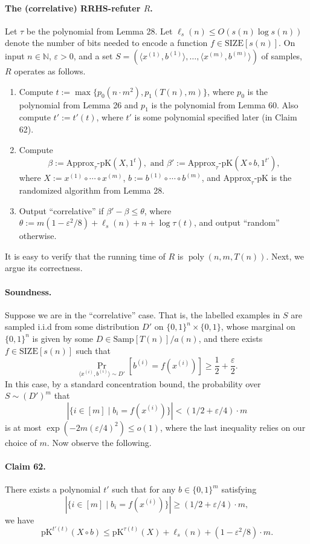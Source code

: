 \paragraph{The (correlative) RRHS-refuter $R$.} Let $\tau$ be the polynomial from Lemma 28. Let $\ell_s(n)\leq O(s(n)\log s(n))$ denote the number of bits needed to encode a function $f\in\mathrm{SIZE}[s(n)]$. On input $n\in\mathbb N$, $\varepsilon>0$, and a set $S=(\langle x^{(1)},b^{(1)}\rangle,\ldots,\langle x^{(m)},b^{(m)}\rangle)$ of samples, $R$ operates as follows.
\begin{enumerate}
\item Compute $t:=\max\{p_0(n\cdot m^2),p_1(T(n),m)\}$, where $p_0$ is the polynomial from Lemma 26 and $p_1$ is the polynomial from Lemma 60. Also compute $t':=t'(t)$, where $t'$ is some polynomial specified later (in Claim 62).
\item Compute
\[\beta:=\mathrm{Approx}_\tau\text{-}\mathrm{pK}(X,1^t),\text{ and }\beta':=\mathrm{Approx}_\tau\text{-}\mathrm{pK}(X\circ b,1^{t'}),\]
where $X:=x^{(1)}\circ\cdots\circ x^{(m)}$, $b:=b^{(1)}\circ\cdots\circ b^{(m)}$, and $\mathrm{Approx}_\tau\text{-}\mathrm{pK}$ is the randomized algorithm from Lemma 28.
\item Output ``correlative'' if $\beta'-\beta\leq\theta$, where $\theta:=m(1-\varepsilon^2/8)+\ell_s(n)+n+\log\tau(t)$, and output ``random'' otherwise.
\end{enumerate}
It is easy to verify that the running time of $R$ is $\operatorname{poly}(n,m,T(n))$. Next, we argue its correctness.
\paragraph{Soundness.} Suppose we are in the ``correlative'' case. That is, the labelled examples in $S$ are sampled i.i.d from some distribution $D'$ on $\{0,1\}^n\times\{0,1\}$, whose marginal on $\{0,1\}^n$ is given by some $D\in\mathrm{Samp}[T(n)]/a(n)$, and there exists $f\in\mathrm{SIZE}[s(n)]$ such that
\[\Pr_{\langle x^{(i)},b^{(i)}\rangle\sim D'}[b^{(i)}=f(x^{(i)})]\geq\frac12+\frac\varepsilon2.\]
In this case, by a standard concentration bound, the probability over $S\sim(D')^m$ that
\[|\{i\in[m]\mid b_i=f(x^{(i)})\}|<(1/2+\varepsilon/4)\cdot m\]
is at most $\exp(-2m(\varepsilon/4)^2)\leq o(1)$, where the last inequality relies on our choice of $m$. Now observe the following.
\paragraph{Claim 62.} There exists a polynomial $t'$ such that for any $b\in\{0,1\}^m$ satisfying
\[|\{i\in[m]\mid b_i=f(x^{(i)})\}|\geq(1/2+\varepsilon/4)\cdot m,\]
we have
\[\mathrm{pK}^{t'(t)}(X\circ b)\leq\mathrm{pK}^{\tau(t)}(X)+\ell_s(n)+(1-\varepsilon^2/8)\cdot m.\]
